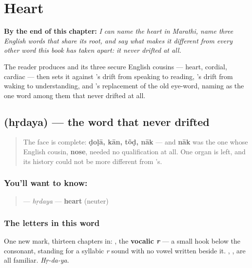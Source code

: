 
\chapter{Heart}
\label{ch:mr-heart}

\begin{chapteropening}
\textbf{By the end of this chapter:} \emph{I can name the heart in Marathi, name three English words that share its root, and say what makes it different from every other word this book has taken apart: it never drifted at all.}

The reader produces  and its three secure English cousins — heart, cordial, cardiac — then sets it against 's drift from speaking to reading, 's drift from waking to understanding, and 's replacement of the old eye-word, naming  as the one word among them that never drifted at all.
\end{chapteropening}

\section[\texorpdfstring{\mr{हृदय} (hṛdaya)}{हृदय (hṛdaya)}]{ (hṛdaya) — the word that never drifted}

\label{lesson:MR-C13-hrudaya}



\begin{quote}
The face is complete: \textbf{ḍoḷā, kān, tõḍ, nāk} — and \textbf{nāk} was the one whose English cousin, \textbf{nose}, needed no qualification at all. One organ is left, and its history could not be more different from \textbf{}'s.
\end{quote}

\subsection*{You'll want to know: }
\begin{quote}
\textbf{} — \emph{hṛdaya} — \textbf{heart} (neuter)
\end{quote}

\subsection*{The letters in this word}
One new mark, thirteen chapters in: \textbf{}, the \textbf{vocalic \emph{r}} — a small hook below the consonant, standing for a syllabic \emph{r} sound with no vowel written beside it. \textbf{}, \textbf{}, \textbf{} are all familiar. \emph{Hṛ-da-ya}.

